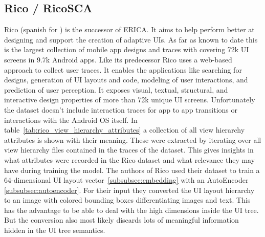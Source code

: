 \subsection{Rico / RicoSCA}

Rico \cite{deka2017rico} (spanish for ) is the successor of ERICA.
It aims to help perform better at designing and support the creation of adaptive UIs.
As far as known to date this is the largest collection of mobile app designs and traces with covering 72k UI screens in 9.7k Android apps.
Like its predecessor Rico uses a web-based approach to collect user traces.
It enables the applications like searching for designs, generation of UI layouts and code, modeling of user interactions, and prediction of user perception.
It exposes visual, textual, structural, and interactive design properties of more than 72k unique UI screens.
Unfortunately the dataset doesn't include interaction traces for app to app transitions or interactions with the Android OS itself.
In table~\ref{tab:rico_view_hierarchy_attributes} a collection of all view hierarchy attributes is shown with their meaning.
These were extracted by iterating over all view hierarchy files contained in the traces of the dataset.
This gives insights in what attributes were recorded in the Rico dataset and what relevance they may have during training the model.
The authors of Rico used their dataset to train a 64-dimensional UI layout vector~\ref{subsubsec:embedding} with an AutoEncoder \ref{subsubsec:autoencoder}.
For their input they converted the UI layout hierarchy to an image with colored bounding boxes differentiating images and text.
This has the advantage to be able to deal with the high dimensions inside the UI tree.
But the conversion also most likely discards lots of meaningful information hidden in the UI tree semantics.

